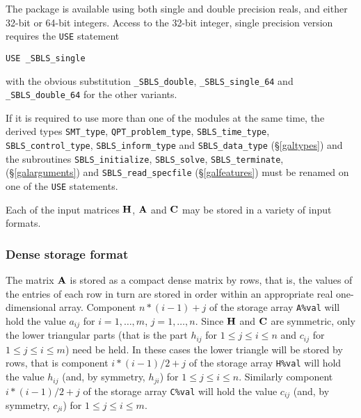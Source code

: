 \documentclass{galahad}
\newcommand{\packagename}{SBLS}
\newcommand{\fullpackagename}{\libraryname\_\packagename}
\begin{document}
\galhowto

The package is available using both single and double precision reals, 
and either 32-bit or 64-bit integers. Access to the 32-bit integer,
single precision version requires the {\tt USE} statement
\medskip

\hspace{8mm} {\tt USE \fullpackagename\_single}

\medskip
\noindent
with the obvious substitution {\tt \fullpackagename\_double},
{\tt \fullpackagename\_single\_64} and 
{\tt \fullpackagename\_double\_64} for the other variants.

\noindent
If it is required to use more than one of the modules at the same time, 
the derived types
{\tt SMT\_type},
{\tt QPT\_problem\_type},
{\tt \packagename\_time\_type},
{\tt \packagename\_control\_type},
{\tt \packagename\_inform\_type}
and
{\tt \packagename\_data\_type}
(\S\ref{galtypes})
and the subroutines
{\tt \packagename\_initialize},
{\tt \packagename\_\-solve},
{\tt \packagename\_terminate},
(\S\ref{galarguments})
and
{\tt \packagename\_read\_specfile}
(\S\ref{galfeatures})
must be renamed on one of the {\tt USE} statements.


\galmatrix
Each of the input matrices ${\mathbf{H}}$, ${\mathbf{A}}$ and ${\mathbf{C}}$
may be stored in a variety of input formats.

\subsubsection{Dense storage format}\label{dense}
The matrix ${\mathbf{A}}$ is stored as a compact
dense matrix by rows, that is, the values of the entries of each row in turn are
stored in order within an appropriate real one-dimensional array.
Component $n \ast (i-1) + j$ of the storage array {\tt A\%val} will hold the
value $a_{ij}$ for $i = 1, \ldots , m$, $j = 1, \ldots , n$.
Since ${\mathbf{H}}$ and ${\mathbf{C}}$ are symmetric, only the lower triangular parts
(that is the part $h_{ij}$ for $1 \leq j \leq i \leq n$ and
$c_{ij}$ for $1 \leq j \leq i \leq m$) need be held. In these cases
the lower triangle will be stored by rows, that is
component $i \ast (i-1)/2 + j$ of the storage array {\tt H\%val}
will hold the value $h_{ij}$ (and, by symmetry, $h_{ji}$)
for $1 \leq j \leq i \leq n$. Similarly
component $i \ast (i-1)/2 + j$ of the storage array {\tt C\%val}
will hold the value $c_{ij}$ (and, by symmetry, $c_{ji}$)
for $1 \leq j \leq i \leq m$.
\end{document}
